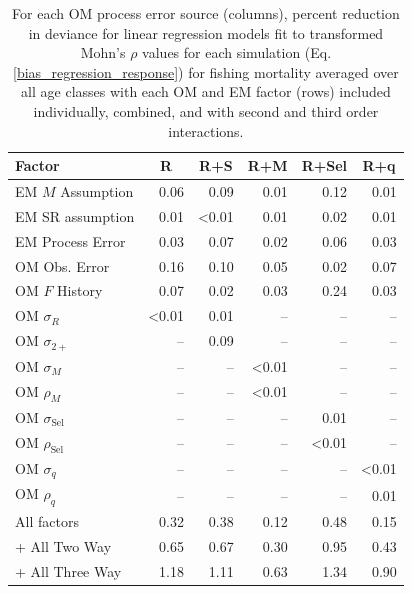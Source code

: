 \documentclass[
  12pt,
]{article}
\begin{document}
\begin{table}
\caption{For each OM process error source (columns), percent reduction in deviance for linear regression models fit to transformed Mohn's $\rho$ values for each simulation (Eq. \ref{bias_regression_response}) for fishing mortality averaged over all age classes with each OM and EM factor (rows) included individually, combined, and with second and third order interactions.}\label{mohns_rho_F_PRD_table}
{\begin{center}
\begin{tabular}{lrrrrr}
\hline\hline
\multicolumn{1}{l}{Factor}&\multicolumn{1}{c}{R}&\multicolumn{1}{c}{R+S}&\multicolumn{1}{c}{R+M}&\multicolumn{1}{c}{R+Sel}&\multicolumn{1}{c}{R+q}\tabularnewline
\hline
EM $M$ Assumption&0.06&0.09&0.01&0.12&0.01\tabularnewline
EM SR assumption&0.01&\textless  0.01&0.01&0.02&0.01\tabularnewline
EM Process Error&0.03&0.07&0.02&0.06&0.03\tabularnewline
OM Obs. Error&0.16&0.10&0.05&0.02&0.07\tabularnewline
OM $F$ History&0.07&0.02&0.03&0.24&0.03\tabularnewline
OM $\sigma_R$&\textless  0.01&0.01&--&--&--\tabularnewline
OM $\sigma_{2+}$ &--&0.09&--&--&--\tabularnewline
OM $\sigma_M$&--&--&\textless  0.01&--&--\tabularnewline
OM $\rho_M$&--&--&\textless  0.01&--&--\tabularnewline
OM $\sigma_{\text{Sel}}$&--&--&--&0.01&--\tabularnewline
OM $\rho_{\text{Sel}}$&--&--&--&\textless  0.01&--\tabularnewline
OM $\sigma_q$&--&--&--&--&\textless  0.01\tabularnewline
OM $\rho_q$&--&--&--&--&0.01\tabularnewline
All factors&0.32&0.38&0.12&0.48&0.15\tabularnewline
+ All Two Way&0.65&0.67&0.30&0.95&0.43\tabularnewline
+ All Three Way&1.18&1.11&0.63&1.34&0.90\tabularnewline
\hline
\end{tabular}\end{center}
}
\end{table}
\end{document}
